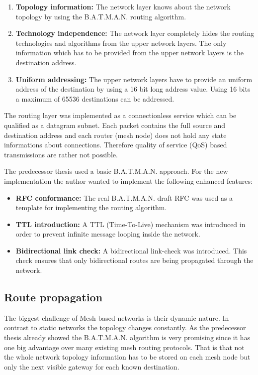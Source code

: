\begin{enumerate}
    \item \textbf{Topology information:} The network layer knows about the network topology by using the B.A.T.M.A.N. routing algorithm.
    \item \textbf{Technology independence:} The network layer completely hides the routing technologies and algorithms from the upper network layers. The only information which has to be provided from the upper network layers is the destination address.
    \item \textbf{Uniform addressing:} The upper network layers have to provide an uniform address of the destination by using a 16 bit long address value. Using 16 bits a maximum of 65536 destinations can be addressed.
\end{enumerate}

The routing layer was implemented as a connectionless service which can be qualified as a datagram subnet. Each packet contains the full source and destination address and each router (mesh node) does not hold any state informations about connections. Therefore quality of service (QoS) based transmissions are rather not possible.

The predecessor thesis used a basic B.A.T.M.A.N. approach. For the new implementation the author wanted to implement the following enhanced features:

\begin{itemize}
    \item \textbf{RFC conformance:} The real B.A.T.M.A.N. draft RFC \cite{batmanrfc} was used as a template for implementing the routing algorithm.
    \item \textbf{TTL introduction:} A TTL (Time-To-Live) mechanism was introduced in order to prevent infinite message looping inside the network.
    \item \textbf{Bidirectional link check:} A bidirectional link-check was introduced. This check ensures that only bidirectional routes are being propagated through the network.
\end{itemize}

\subsection{Route propagation}%
\label{sub:route_propagation}
The biggest challenge of Mesh based networks is their dynamic nature. In contrast to static networks the topology changes constantly. As the predecessor thesis already showed the B.A.T.M.A.N. algorithm is very promising since it has one big advantage over many existing mesh routing protocols. That is that not the whole network topology information has to be stored on each mesh node but only the next visible gateway for each known destination.

